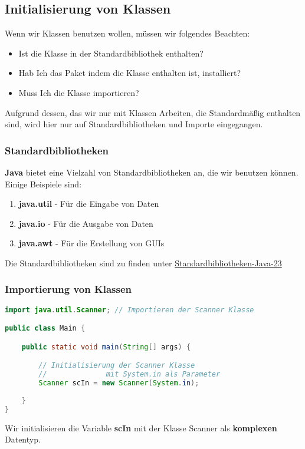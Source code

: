 \documentclass[12pt, a4paper]{article}
\begin{document}
\subsection*{Initialisierung von Klassen}
Wenn wir Klassen benutzen wollen, müssen wir folgendes Beachten:
\begin{itemize}
    \item Ist die Klasse in der Standardbibliothek enthalten?
    \item Hab Ich das Paket indem die Klasse enthalten ist, installiert?
    \item Muss Ich die Klasse importieren?
\end{itemize}
Aufgrund dessen, das wir nur mit Klassen Arbeiten, die Standardmäßig enthalten sind, wird hier nur auf Standardbibliotheken und Importe eingegangen.
\subsubsection*{Standardbibliotheken}
\textbf{Java} bietet eine Vielzahl von Standardbibliotheken an, die wir benutzen können. \\
Einige Beispiele sind:
\begin{enumerate}[label=-]
    \item \textbf{java.util} - Für die Eingabe von Daten
    \item \textbf{java.io} - Für die Ausgabe von Daten
    \item \textbf{java.awt} - Für die Erstellung von GUIs
\end{enumerate}
Die Standardbibliotheken sind zu finden unter \href{https://docs.oracle.com/en/java/javase/23/docs/api/index.html}{Standardbibliotheken-Java-23}
\subsubsection*{Importierung von Klassen}
\begin{lstlisting}[language=java,title=Beispiel mit der Scanner Klasse]
import java.util.Scanner; // Importieren der Scanner Klasse

public class Main {

    public static void main(String[] args) {

        // Initialisierung der Scanner Klasse
        //              mit System.in als Parameter
        Scanner scIn = new Scanner(System.in); 
    
    }
}
\end{lstlisting}
Wir initialisieren die Variable \textbf{scIn} mit der Klasse Scanner als \textbf{komplexen} Datentyp.
\newpage
\end{document}
